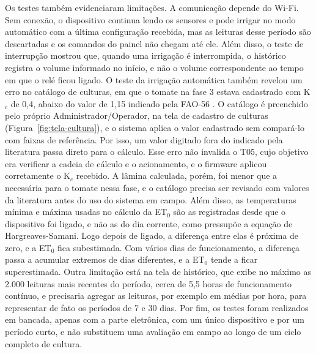 Os testes também evidenciaram limitações. A comunicação depende do Wi-Fi. Sem conexão, o dispositivo continua lendo os sensores e pode irrigar no modo automático com a última configuração recebida, mas as leituras desse período são descartadas e os comandos do painel não chegam até ele. Além disso, o teste de interrupção mostrou que, quando uma irrigação é interrompida, o histórico registra o volume informado no início, e não o volume correspondente ao tempo em que o relé ficou ligado. O teste da irrigação automática também revelou um erro no catálogo de culturas, em que o tomate na fase 3 estava cadastrado com K$_c$ de 0,4, abaixo do valor de 1,15 indicado pela FAO-56 \cite{allen1998}. O catálogo é preenchido pelo próprio Administrador/Operador, na tela de cadastro de culturas (Figura~\ref{fig:tela-cultura}), e o sistema aplica o valor cadastrado sem compará-lo com faixas de referência. Por isso, um valor digitado fora do indicado pela literatura passa direto para o cálculo. Esse erro não invalida o T05, cujo objetivo era verificar a cadeia de cálculo e o acionamento, e o firmware aplicou corretamente o K$_c$ recebido. A lâmina calculada, porém, foi menor que a necessária para o tomate nessa fase, e o catálogo precisa ser revisado com valores da literatura antes do uso do sistema em campo. Além disso, as temperaturas mínima e máxima usadas no cálculo da ET$_0$ são as registradas desde que o dispositivo foi ligado, e não as do dia corrente, como pressupõe a equação de Hargreaves-Samani. Logo depois de ligado, a diferença entre elas é próxima de zero, e a ET$_0$ fica subestimada. Com vários dias de funcionamento, a diferença passa a acumular extremos de dias diferentes, e a ET$_0$ tende a ficar superestimada. Outra limitação está na tela de histórico, que exibe no máximo as 2.000 leituras mais recentes do período, cerca de 5,5 horas de funcionamento contínuo, e precisaria agregar as leituras, por exemplo em médias por hora, para representar de fato os períodos de 7 e 30 dias. Por fim, os testes foram realizados em bancada, apenas com a parte eletrônica, com um único dispositivo e por um período curto, e não substituem uma avaliação em campo ao longo de um ciclo completo de cultura.
